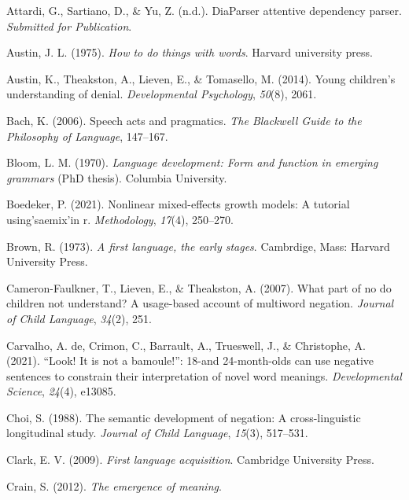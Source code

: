 \documentclass[
  man,floatsintext]{apa6}
\newlength{\cslhangindent}
\newenvironment{CSLReferences}[2] %
 {\begin{list}{}{%
  \setlength{\itemindent}{0pt}
  \setlength{\leftmargin}{0pt}
  \setlength{\parsep}{0pt}
  \ifodd #1
   \setlength{\leftmargin}{\cslhangindent}
   \setlength{\itemindent}{-1\cslhangindent}
  \fi
  \setlength{\itemsep}{#2\baselineskip}}}
 {\end{list}}
\begin{document}
\label{refs}
\begin{CSLReferences}{1}{0}
Attardi, G., Sartiano, D., \& Yu, Z. (n.d.). DiaParser attentive dependency parser. \emph{Submitted for Publication}.

Austin, J. L. (1975). \emph{How to do things with words}. Harvard university press.

Austin, K., Theakston, A., Lieven, E., \& Tomasello, M. (2014). Young children's understanding of denial. \emph{Developmental Psychology}, \emph{50}(8), 2061.

Bach, K. (2006). Speech acts and pragmatics. \emph{The Blackwell Guide to the Philosophy of Language}, 147--167.

Bloom, L. M. (1970). \emph{Language development: Form and function in emerging grammars} (PhD thesis). Columbia University.

Boedeker, P. (2021). Nonlinear mixed-effects growth models: A tutorial using'saemix'in r. \emph{Methodology}, \emph{17}(4), 250--270.

Brown, R. (1973). \emph{A first language, the early stages}. Cambrdige, Mass: Harvard University Press.

Cameron-Faulkner, T., Lieven, E., \& Theakston, A. (2007). What part of no do children not understand? A usage-based account of multiword negation. \emph{Journal of Child Language}, \emph{34}(2), 251.

Carvalho, A. de, Crimon, C., Barrault, A., Trueswell, J., \& Christophe, A. (2021). {``Look! It is not a bamoule!''}: 18-and 24-month-olds can use negative sentences to constrain their interpretation of novel word meanings. \emph{Developmental Science}, \emph{24}(4), e13085.

Choi, S. (1988). The semantic development of negation: A cross-linguistic longitudinal study. \emph{Journal of Child Language}, \emph{15}(3), 517--531.

Clark, E. V. (2009). \emph{First language acquisition}. Cambridge University Press.

Crain, S. (2012). \emph{The emergence of meaning}.


\end{CSLReferences}
\end{document}
